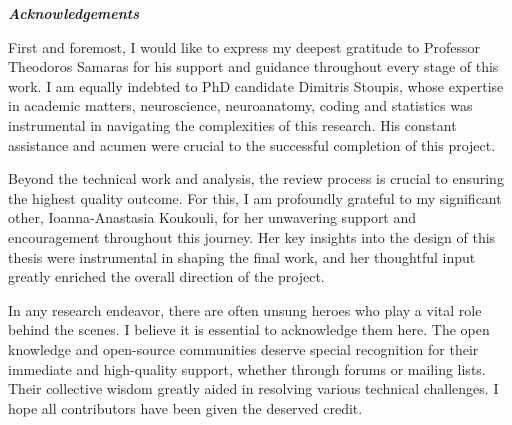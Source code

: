 \thispagestyle{plain}
\begin{center}
    \LARGE
    \textit{\textbf{Acknowledgements}}
        
    \vspace{0.4cm}
\end{center}
\normalsize

\vspace{0.9cm}

First and foremost, I would like to express my deepest gratitude to Professor Theodoros Samaras for his support and guidance throughout every stage of this work. I am equally indebted to PhD candidate Dimitris Stoupis, whose expertise in academic matters, neuroscience, neuroanatomy, coding and statistics was instrumental in navigating the complexities of this research. His constant assistance and acumen were crucial to the successful completion of this project.

Beyond the technical work and analysis, the review process is crucial to ensuring the highest quality outcome. For this, I am profoundly grateful to my significant other, Ioanna-Anastasia Koukouli, for her unwavering support and encouragement throughout this journey. Her key insights into the design of this thesis were instrumental in shaping the final work, and her thoughtful input greatly enriched the overall direction of the project.

In any research endeavor, there are often unsung heroes who play a vital role behind the scenes. I believe it is essential to acknowledge them here. The open knowledge and open-source communities deserve special recognition for their immediate and high-quality support, whether through forums or mailing lists. Their collective wisdom greatly aided in resolving various technical challenges. I hope all contributors have been given the deserved credit.

\vspace*{\fill}

